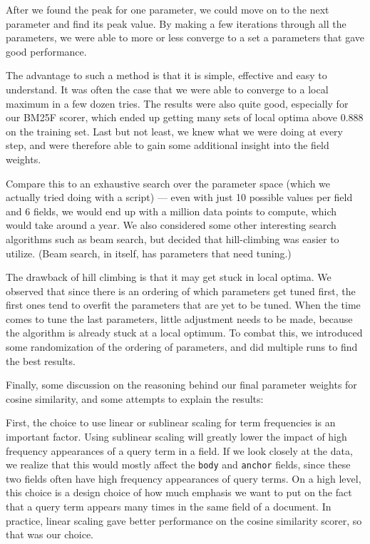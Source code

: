 \documentclass[10pt,twocolumn]{article}
\begin{document}
After we found the peak for one parameter, we could move on to the next parameter and find its peak value. By making a few iterations through all the parameters, we were able to more or less converge to a set a parameters that gave good performance.

The advantage to such a method is that it is simple, effective and easy to understand. It was often the case that we were able to converge to a local maximum in a few dozen tries. The results were also quite good, especially for our BM25F scorer, which ended up getting many sets of local optima above 0.888 on the training set. Last but not least, we knew what we were doing at every step, and were therefore able to gain some additional insight into the field weights.

Compare this to an exhaustive search over the parameter space (which we actually tried doing with a script) --- even with just 10 possible values per field and 6 fields, we would end up with a million data points to compute, which would take around a year. We also considered some other interesting search algorithms such as beam search, but decided that hill-climbing was easier to utilize. (Beam search, in itself, has parameters that need tuning.)

The drawback of hill climbing is that it may get stuck in local optima. We observed that since there is an ordering of which parameters get tuned first, the first ones tend to overfit the parameters that are yet to be tuned. When the time comes to tune the last parameters, little adjustment needs to be made, because the algorithm is already stuck at a local optimum. To combat this, we introduced some randomization of the ordering of parameters, and did multiple runs to find the best results.

Finally, some discussion on the reasoning behind our final parameter weights for cosine similarity, and some attempts to explain the results:

First, the choice to use linear or sublinear scaling for term frequencies is an important factor. Using sublinear scaling will greatly lower the impact of high frequency appearances of a query term in a field. If we look closely at the data, we realize that this would mostly affect the \texttt{body} and \texttt{anchor} fields, since these two fields often have high frequency appearances of query terms. On a high level, this choice is a design choice of how much emphasis we want to put on the fact that a query term appears many times in the same field of a document. In practice, linear scaling gave better performance on the cosine similarity scorer, so that was our choice.
\end{document}
